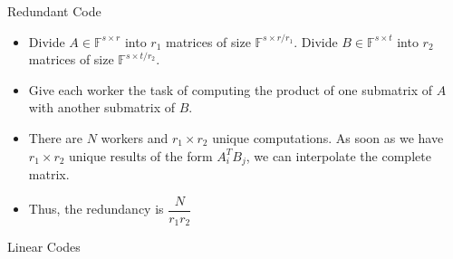 \documentclass{beamer}
\begin{document}
\begin{frame}{Redundant Code}
    \begin{itemize}
        \item Divide $A \in \mathbb{F}^{s \times r}$ into $r_{1}$ matrices of size $\mathbb{F}^{s\times r / r_{1}}$. Divide $B \in \mathbb{F}^{s \times t}$ into $r_{2}$ matrices of size $\mathbb{F}^{s \times t / r_{2}}$. 
        \item Give each worker the task of computing the product of one submatrix of $A$ with another submatrix of $B$.
        \item There are $N$ workers and $r_{1} \times r_{2}$ unique computations. As soon as we have $r_{1} \times r_{2}$ unique results of the form $A^T_iB_j$, we can interpolate the complete matrix.
        \item Thus, the redundancy is $\dfrac{N}{r_{1} r_{2}}$
    \end{itemize}
\end{frame}

\begin{frame}{Linear Codes}
\end{frame}
\end{document}
